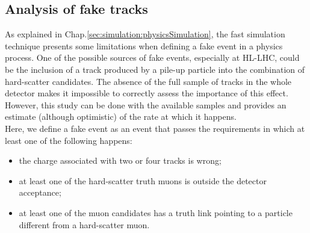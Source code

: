\documentclass[a4paper,twoside,12pt]{book}
\begin{document}
\begin{table} [h]
	\caption{Comparison between the $4\mu$ mass resolutions with or without
	the photon selection applied during the generation stage. Values are expressed
	in GeV.}
	\label{tab:massResolutionWithPhotons}
\end{table}

\subsection*{Analysis of fake tracks}
As explained in Chap.\ref{sec:simulation:physicsSimulation}, the fast simulation technique 
presents some limitations when defining a fake event in a physics process. One of the
possible sources of fake events, especially at HL-LHC, could be the inclusion of a 
track produced by a pile-up particle into the combination of hard-scatter candidates.
The absence of the full sample of tracks in the whole detector makes it impossible
to correctly assess the importance of this effect. However, this study can be done with the 
available samples and provides an estimate (although optimistic) of the rate at which it happens.\\

Here, we define a fake event as an event that passes the requirements in which at least one of 
the following happens:\\
\begin{itemize}
\item the charge associated with two or four tracks is wrong;
\item at least one of the hard-scatter truth muons is outside the detector acceptance;
\item at least one of the muon candidates has a truth link pointing to a particle different
from a hard-scatter muon.
\end{itemize}
\end{document}
